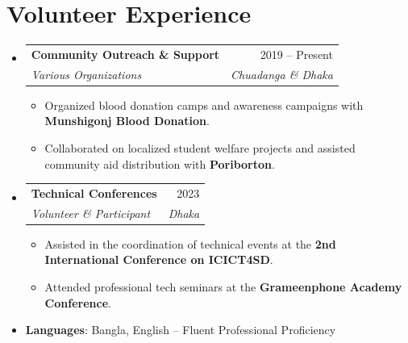 \documentclass[letterpaper,11pt]{article}
\makeatletter
\newcommand{\resumeItem}[1]{
  \item\small{
    {#1 \vspace{-2pt}}
  }
}
\newcommand{\resumeSubheading}[4]{
  \vspace{1pt}\item
    \begin{tabularx}{\linewidth}{@{}X@{\hspace{10pt}}r@{}}
      \textbf{#1} & #2 \\
      \textit{\small#3} & \textit{\small #4} \\
    \end{tabularx}\vspace{-3pt} 
}
\newcommand{\resumeSubHeadingListStart}{\begin{itemize}[leftmargin=0.15in, label={}, itemsep=3pt, topsep=1pt]}
\newcommand{\resumeSubHeadingListEnd}{\end{itemize}}
\newcommand{\resumeItemListStart}{\begin{itemize}[noitemsep, topsep=1pt, parsep=0pt, partopsep=0pt]}
\newcommand{\resumeItemListEnd}{\end{itemize}\vspace{-3pt}}
\makeatother
\begin{document}
\section{Volunteer Experience}
  \resumeSubHeadingListStart
    \resumeSubheading{Community Outreach \& Support}{2019 -- Present}{Various Organizations}{Chuadanga \& Dhaka}
      \resumeItemListStart
        \resumeItem{Organized blood donation camps and awareness campaigns with \textbf{Munshigonj Blood Donation}.}
        \resumeItem{Collaborated on localized student welfare projects and assisted community aid distribution with \textbf{Poriborton}.}
      \resumeItemListEnd
    \resumeSubheading{Technical Conferences}{2023}{Volunteer \& Participant}{Dhaka}
      \resumeItemListStart
        \resumeItem{Assisted in the coordination of technical events at the \textbf{2nd International Conference on ICICT4SD}.}
        \resumeItem{Attended professional tech seminars at the \textbf{Grameenphone Academy Conference}.}
      \resumeItemListEnd
  \resumeSubHeadingListEnd

 \begin{itemize}[leftmargin=0.15in, label={}, noitemsep, topsep=2pt]
    \item \small{\textbf{Languages}{: Bangla, English -- Fluent Professional Proficiency}}
 \end{itemize}

\end{document}
